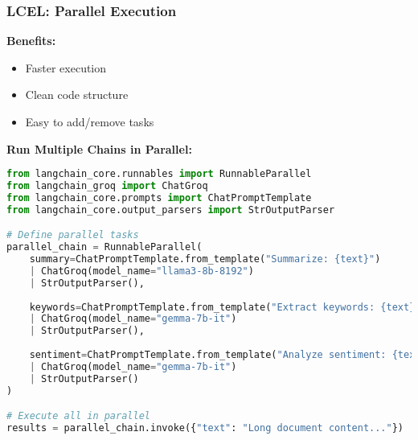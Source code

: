 \begin{frame}[fragile]\frametitle{LCEL: Parallel Execution}
\textbf{Benefits:}
\begin{itemize}
\item Faster execution
\item Clean code structure
\item Easy to add/remove tasks
\end{itemize}

\textbf{Run Multiple Chains in Parallel:}
\begin{lstlisting}[language=python, basicstyle=\tiny]
from langchain_core.runnables import RunnableParallel
from langchain_groq import ChatGroq
from langchain_core.prompts import ChatPromptTemplate
from langchain_core.output_parsers import StrOutputParser

# Define parallel tasks
parallel_chain = RunnableParallel(
    summary=ChatPromptTemplate.from_template("Summarize: {text}")
    | ChatGroq(model_name="llama3-8b-8192")
    | StrOutputParser(),
    
    keywords=ChatPromptTemplate.from_template("Extract keywords: {text}")
    | ChatGroq(model_name="gemma-7b-it")
    | StrOutputParser(),
    
    sentiment=ChatPromptTemplate.from_template("Analyze sentiment: {text}")
    | ChatGroq(model_name="gemma-7b-it")
    | StrOutputParser()
)

# Execute all in parallel
results = parallel_chain.invoke({"text": "Long document content..."})
\end{lstlisting}

\end{frame}

